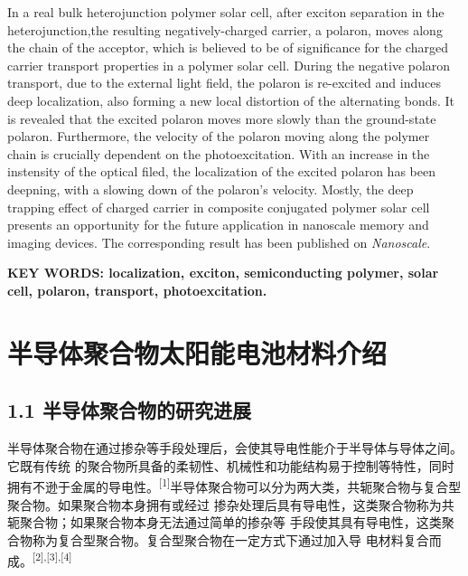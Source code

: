 \documentclass[12pt,]{report}
\begin{document}
In a real bulk heterojunction polymer solar cell, after exciton
separation in the heterojunction,the resulting negatively-charged
carrier, a polaron, moves along the chain of the acceptor, which is
believed to be of significance for the charged carrier transport
properties in a polymer solar cell. During the negative polaron
transport, due to the external light field, the polaron is re-excited
and induces deep localization, also forming a new local distortion of
the alternating bonds. It is revealed that the excited polaron moves
more slowly than the ground-state polaron. Furthermore, the velocity of
the polaron moving along the polymer chain is crucially dependent on the
photoexcitation. With an increase in the instensity of the optical
filed, the localization of the excited polaron has been deepning, with a
slowing down of the polaron's velocity. Mostly, the deep trapping effect
of charged carrier in composite conjugated polymer solar cell presents
an opportunity for the future application in nanoscale memory and
imaging devices. The corresponding result has been published on
\emph{Nanoscale}.

\vspace{1.5cm}

\noindent
\large 
\textbf{KEY WORDS: localization, exciton, semiconducting polymer, solar cell,
polaron, transport, photoexcitation.
}

\clearpage
 \cleardoublepage
{} \tableofcontents
\cleardoublepage
{}

\pagestyle{fancy}

\chapter{半导体聚合物太阳能电池材料介绍}\label{ux534aux5bfcux4f53ux805aux5408ux7269ux592aux9633ux80fdux7535ux6c60ux6750ux6599ux4ecbux7ecd}

\lhead{}  \rhead{}

\section{1.1
半导体聚合物的研究进展}\label{ux534aux5bfcux4f53ux805aux5408ux7269ux7684ux7814ux7a76ux8fdbux5c55}

半导体聚合物在通过掺杂等手段处理后，会使其导电性能介于半导体与导体之间。它既有传统
的聚合物所具备的柔韧性、机械性和功能结构易于控制等特性，同时拥有不逊于金属的导电性。\textsuperscript{{[}1{]}}半导体聚合物可以分为两大类，共轭聚合物与复合型聚合物。如果聚合物本身拥有或经过
掺杂处理后具有导电性，这类聚合物称为共轭聚合物；如果聚合物本身无法通过简单的掺杂等
手段使其具有导电性，这类聚合物称为复合型聚合物。复合型聚合物在一定方式下通过加入导
电材料复合而成。\textsuperscript{{[}2{]},{[}3{]},{[}4{]}}
\end{document}
